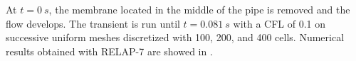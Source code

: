\documentclass{inputs/mc2015}
\begin{document}
At $t = 0\ s$, the membrane located in the middle of the pipe is removed and the flow develops. The transient is run until $t = 0.081\ s$ with a CFL of 0.1 on successive uniform meshes discretized with 100, 200, and 400 cells. Numerical results obtained with RELAP-7 are showed in .
%        
\end{document}
